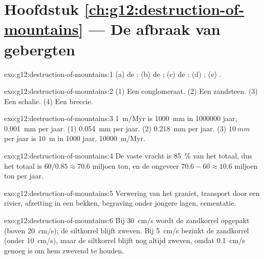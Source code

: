 \section*{Hoofdstuk \ref{ch:g12:destruction-of-mountains} --- De afbraak van gebergten}

\begin{solution}{exo:g12:destruction-of-mountains:1}
(a) de ; (b) de ; (c) de ;
(d) ; (e) .
\end{solution}

\begin{solution}{exo:g12:destruction-of-mountains:2}
(1) Een conglomeraat. (2) Een zandsteen. (3) Een schalie. (4) Een breccie.
\end{solution}

\begin{solution}{exo:g12:destruction-of-mountains:3}
\qty{1}{m/Myr} is \qty{1000}{mm} in \num{1000000} jaar, \qty{0.001}{mm} per
jaar. (1) \qty{0.054}{mm} per jaar. (2) \qty{0.218}{mm} per jaar.
(3) $\qty{10}{mm}$ per jaar is \qty{10}{m} in 1000 jaar, \qty{10000}{m/Myr}.
\end{solution}

\begin{solution}{exo:g12:destruction-of-mountains:4}
De vaste vracht is \qty{85}{\percent} van het totaal, dus het totaal is $60/0.85
\approx 70.6$ miljoen ton, en de  ongeveer $70.6 - 60 \approx
10.6$ miljoen ton per jaar.
\end{solution}

\begin{solution}{exo:g12:destruction-of-mountains:5}
Verwering van het graniet, transport door een rivier, afzetting in een bekken,
begraving onder jongere lagen, cementatie.
\end{solution}

\begin{solution}{exo:g12:destruction-of-mountains:6}
Bij \qty{30}{cm/s} wordt de zandkorrel opgepakt (boven \qty{20}{cm/s}); de
siltkorrel blijft zweven. Bij \qty{5}{cm/s} bezinkt de zandkorrel
(onder \qty{10}{cm/s}), maar de siltkorrel blijft nog altijd zweven, omdat
\qty{0.1}{cm/s} genoeg is om hem zwevend te houden.
\end{solution}

